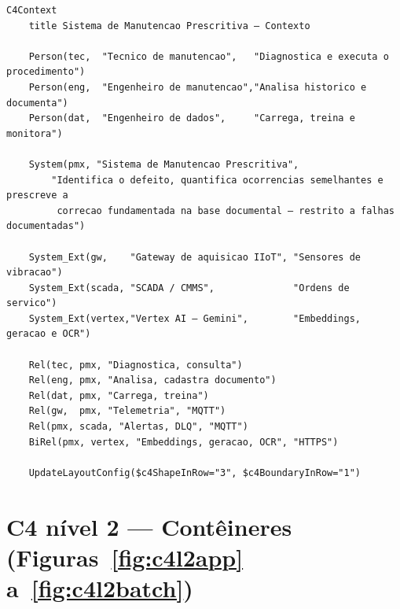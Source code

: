 \begin{lstlisting}[language=mermaid, caption={C4 nível 1 --- contexto do sistema}, label={lst:mmc4l1}]
C4Context
    title Sistema de Manutencao Prescritiva — Contexto

    Person(tec,  "Tecnico de manutencao",   "Diagnostica e executa o procedimento")
    Person(eng,  "Engenheiro de manutencao","Analisa historico e documenta")
    Person(dat,  "Engenheiro de dados",     "Carrega, treina e monitora")

    System(pmx, "Sistema de Manutencao Prescritiva",
        "Identifica o defeito, quantifica ocorrencias semelhantes e prescreve a
         correcao fundamentada na base documental — restrito a falhas documentadas")

    System_Ext(gw,    "Gateway de aquisicao IIoT", "Sensores de vibracao")
    System_Ext(scada, "SCADA / CMMS",              "Ordens de servico")
    System_Ext(vertex,"Vertex AI — Gemini",        "Embeddings, geracao e OCR")

    Rel(tec, pmx, "Diagnostica, consulta")
    Rel(eng, pmx, "Analisa, cadastra documento")
    Rel(dat, pmx, "Carrega, treina")
    Rel(gw,  pmx, "Telemetria", "MQTT")
    Rel(pmx, scada, "Alertas, DLQ", "MQTT")
    BiRel(pmx, vertex, "Embeddings, geracao, OCR", "HTTPS")

    UpdateLayoutConfig($c4ShapeInRow="3", $c4BoundaryInRow="1")
\end{lstlisting}

\section{C4 nível 2 --- Contêineres (Figuras~\ref{fig:c4l2app} a~\ref{fig:c4l2batch})}

